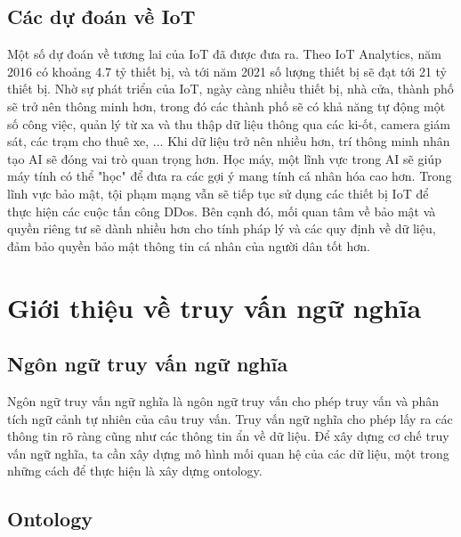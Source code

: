 \subsection{Các dự đoán về IoT}
Một số dự đoán về tương lai của IoT đã được đưa ra. Theo IoT Analytics, năm 2016 có khoảng 4.7 tỷ thiết bị, và tới năm 2021 số lượng thiết bị sẽ đạt tới 21 tỷ thiết bị. Nhờ sự phát triển của IoT, ngày càng nhiều thiết bị, nhà cửa, thành phố sẽ trở nên thông minh hơn, trong đó các thành phố sẽ có khả năng tự động một số công việc, quản lý từ xa và thu thập dữ liệu thông qua các ki-ốt, camera giám sát, các trạm cho thuê xe, ... Khi dữ liệu trở nên nhiều hơn, trí thông minh nhân tạo AI sẽ đóng vai trò quan trọng hơn. Học máy, một lĩnh vực trong AI sẽ giúp máy tính có thể "học" để đưa ra các gợi ý mang tính cá nhân hóa cao hơn. Trong lĩnh vực bảo mật, tội phạm mạng vẫn sẽ tiếp tục sử dụng các thiết bị IoT để thực hiện các cuộc tấn công DDos. Bên cạnh đó, mối quan tâm về bảo mật và quyền riêng tư sẽ dành nhiều hơn cho tính pháp lý và các quy định về dữ liệu, đảm bảo quyền bảo mật thông tin cá nhân của người dân tốt hơn.


\section{Giới thiệu về truy vấn ngữ nghĩa}
\subsection{Ngôn ngữ truy vấn ngữ nghĩa}
Ngôn ngữ truy vấn ngữ nghĩa là ngôn ngữ truy vấn cho phép truy vấn và phân tích ngữ cảnh tự nhiên của câu truy vấn. Truy vấn ngữ nghĩa cho phép lấy ra các thông tin rõ ràng cũng như các thông tin ẩn về dữ liệu. Để xây dựng cơ chế truy vấn ngữ nghĩa, ta cần xây dựng mô hình mối quan hệ của các dữ liệu, một trong những cách để thực hiện là xây dựng ontology.

\subsection{Ontology}
